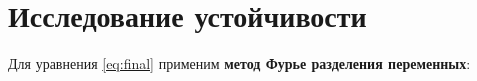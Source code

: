 \section{Исследование устойчивости}

Для уравнения \ref{eq:final} применим \textbf{метод Фурье разделения переменных}: